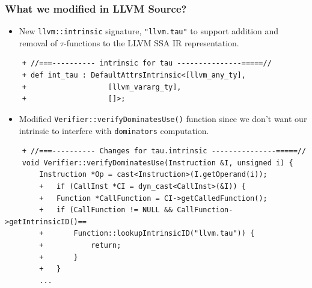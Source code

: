 \documentclass[aspectratio=169, compress]{beamer}
\begin{document}
\begin{frame}[fragile]
	\frametitle{What we modified in LLVM Source?}
	\begin{itemize}
		\item New \texttt{llvm::intrinsic} signature, \texttt{"llvm.tau"} to support addition and removal of $\tau$-functions to the LLVM SSA IR representation. 
	\end{itemize}
	\begin{verbatim}
	+ //===---------- intrinsic for tau ---------------=====//
	+ def int_tau : DefaultAttrsIntrinsic<[llvm_any_ty],
	+                   [llvm_vararg_ty],
	+                   []>;
	\end{verbatim}
	\pause
	\begin{itemize}
		\item Modified \texttt{Verifier::verifyDominatesUse()} function since we don't want our intrinsic to interfere with \texttt{dominators} computation.  
	\end{itemize}
	\begin{verbatim}
	+ //===---------- Changes for tau.intrinsic ---------------=====//
	void Verifier::verifyDominatesUse(Instruction &I, unsigned i) {
		Instruction *Op = cast<Instruction>(I.getOperand(i));
		+	if (CallInst *CI = dyn_cast<CallInst>(&I)) {
		+	Function *CallFunction = CI->getCalledFunction();
		+	if (CallFunction != NULL && CallFunction->getIntrinsicID()==
		+		Function::lookupIntrinsicID("llvm.tau")) {
		+			return;
		+		}
		+	}
		...
	\end{verbatim}
\end{frame}
\end{document}
